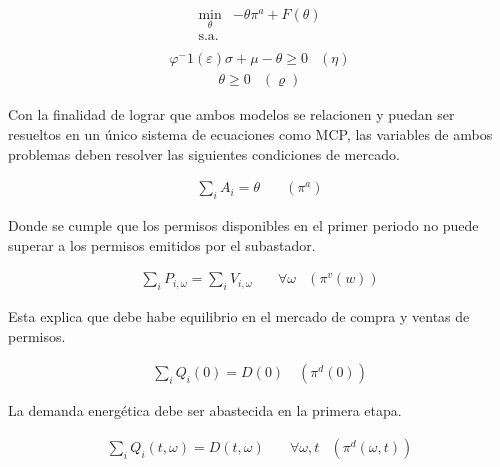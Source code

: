 \begin{equation}
\begin{array}{rrclcl}
    \displaystyle \min_{\theta} &-\theta \pi^a + F(\theta) \\\textrm{s.a.} \label{eq:sub}\\
\end{array}
\end{equation}
\begin{equation}
\begin{array}{cl}
    \varphi^-1 (\varepsilon )\sigma + \mu - \theta \geq 0 & (\eta) \label{res:sub1}
\end{array}
\end{equation}
\begin{equation}
\begin{array}{cl}
   \theta \geq 0 & (\varrho)\label{res:sub2}
\end{array}
\end{equation}

Con la finalidad de lograr que ambos modelos se relacionen y puedan ser resueltos en un único sistema de ecuaciones como MCP, las variables de ambos problemas deben resolver las siguientes condiciones de mercado.

\begin{align}
   \sum_{i}A_i = \theta  &\quad (\pi^a)\label{rescom:1}
\end{align}

Donde se cumple que los permisos disponibles en el primer periodo no puede superar a los permisos emitidos por el subastador.

\begin{align}
    \sum_{i}P_{i,\omega} = \sum_{i}V_{i,\omega} \quad& \forall \omega &(\pi^v (w))\label{rescom:2}
\end{align}
    


Esta explica que debe habe equilibrio en el mercado de compra y ventas de permisos.

\begin{align}
  \sum_{i}Q_i(0) = D(0) \quad (\pi^d (0))\label{rescom:3}  
\end{align}


La demanda energética debe ser abastecida en la primera etapa.

\begin{align}
    \sum_{i}Q_i(t,\omega) = D(t,\omega) \quad& \forall  \omega,t & (\pi^d (\omega,t))\label{rescom:4}
\end{align}

